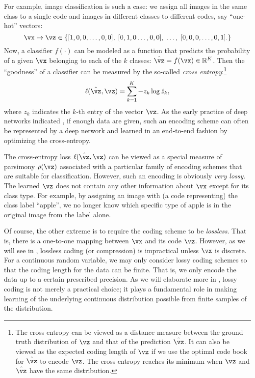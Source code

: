 \documentclass[../../book-main.tex]{subfiles}
\begin{document}
\begin{example}\label{example:image_classification_feature_learning}
    For example, image classification is such a case: we assign all images in the same class to a single code and images in different classes to different codes, say ``one-hot'' vectors:
    \begin{equation}
        \vx \mapsto \vz \in \{  [1, 0, 0, \ldots , 0, 0], \;  [0, 1, 0 \ldots, 0, 0], \; \ldots, \;  [0,0,0, \ldots, 0, 1].\}
        \label{eqn:class-labels}
    \end{equation}
    Now, a classifier \(f(\cdot)\) can be modeled as a function that predicts the probability of a given \(\vx\) belonging to each of the \(k\) classes: \(\hat{\vz} = f(\vx) \in \R^{K}\). Then the ``goodness'' of a classifier can be measured by the so-called {\em cross entropy}:\footnote{The cross entropy can be viewed as a distance measure between the ground truth distribution of \(\vz\) and that of the prediction \(\hat{\vz}\). It can also be viewed as the expected coding length of \(\vz\) if we use the optimal code book for \(\hat{\vz}\) to encode \(\vz\). The cross entropy reaches its minimum when \(\vz\) and \(\hat{\vz}\) have the same distribution.}
    \begin{equation}
        \ell(\hat{\vz}, \vz) = \sum_{k=1}^{K} - z_{k} \log \hat{z}_{k},
    \end{equation}
    where \(z_{k}\) indicates the \(k\)-th entry of the vector \(\vz\). As the early practice of deep networks indicated \cite{krizhevsky2012imagenet}, if enough data are given, such an encoding scheme can often be represented by a deep network and learned in an end-to-end fashion by optimizing the cross-entropy. 
\end{example}

The cross-entropy loss \(\ell(\hat{\vz}, \vz)\) can be viewed as a special measure of parsimony \(\rho(\vz)\) associated with a particular family of encoding schemes that are suitable for classification. However, such an encoding is obviously \textit{very lossy}. The learned \(\vz\) does not contain any other information about \(\vx\) except for its class type. For example, by assigning an image with (a code representing) the class label ``apple'', we no longer know which specific type of apple is in the original image from the label alone. 

Of course, the other extreme is to require the coding scheme to be \textit{lossless}. That is, there is a one-to-one mapping between \(\vx\) and its code \(\vz\). However, as we will see in , lossless coding (or compression) is impractical unless \(\vx\) is discrete. For a continuous random variable, we may only consider lossy coding schemes so that the coding length for the data can be finite. That is, we only encode the data up to a certain prescribed precision. As we will elaborate more in , lossy coding is not merely a practical choice; it plays a fundamental role in making learning of the underlying continuous distribution possible from finite samples of the distribution. 
\end{document}
